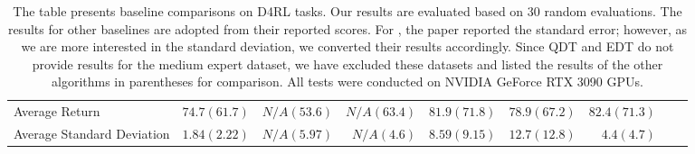 \begin{table*}[h]
\begin{tabular}{lrrrrrrrr}
        \midrule
        Average Return              & $74.7 (61.7)$     & $N/A (53.6)$      & $N/A (63.4)$        & $81.9 (71.8)$       & $78.9 (67.2) $        & $\mathbf{82.4} (71.3)$          \\
        Average Standard Deviation  & $1.84 (2.22)$     & $N/A (5.97)$      & $N/A (4.6)$         & $8.59 (9.15)$       & $12.7 (12.8)$         & $\mathbf{4.4} (4.7)  $            \\

        \bottomrule
    \end{tabular}
    \caption{The table presents baseline comparisons on D4RL tasks. Our results are evaluated based on 30 random evaluations. The results for other baselines are adopted from their reported scores. For \trt{}, the paper reported the standard error; however, as we are more interested in the standard deviation, we converted their results accordingly. 
    Since QDT and EDT do not provide results for the medium expert dataset, we have excluded these datasets and listed the results of the other algorithms in parentheses for comparison. All tests were conducted on NVIDIA GeForce RTX 3090 GPUs.}
    \label{tab:results}
\end{table*}